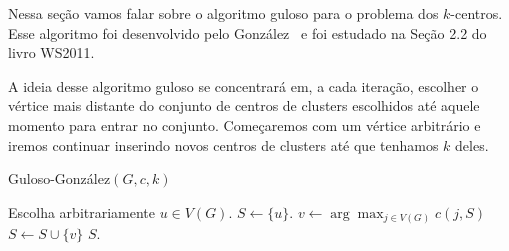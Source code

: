 Nessa seção vamos falar sobre o algoritmo guloso para o problema dos $k$-centros. Esse algoritmo foi desenvolvido pelo González~\cite{GONZALEZ1985293} e foi estudado na Seção 2.2 do livro WS2011.


A ideia desse algoritmo guloso se concentrará em, a cada iteração, escolher o vértice mais distante do conjunto de centros de clusters escolhidos até aquele momento para entrar no conjunto. Começaremos com um vértice arbitrário e iremos continuar inserindo novos centros de clusters até que tenhamos $k$ deles.

\begin{algorithm}
\caption{\sc Guloso-González$(G,c,k)$}
    \label{k-center:guloso}
    \begin{algorithmic}[1]
  \State Escolha arbitrariamente $u \in V(G)$.
        \State $S \gets \{u\}$.
        \State $v \gets \arg\max_{j \in V(G)} c(j,S)$
        \State $S \gets S \cup \{v\}$
        \EndWhile
  \State \Return $S$.
\end{algorithmic}
\end{algorithm}

